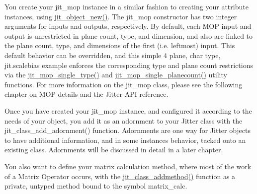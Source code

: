 You create your jit\_\-mop instance in a similar fashion to creating your attribute instances, using \hyperlink{group__objectmod_gabde2eb49750992ec4125af862b402342}{jit\_\-object\_\-new()}. The jit\_\-mop constructor has two integer arguments for inputs and outputs, respectively. By default, each MOP input and output is unrestricted in plane count, type, and dimension, and also are linked to the plane count, type, and dimensions of the first (i.e. leftmost) input. This default behavior can be overridden, and this simple 4 plane, char type, jit.scalebias example enforces the corresponding type and plane count restrictions via the \hyperlink{group__mopmod_ga8923e590eaf3cdb7d92c7f982ddc169f}{jit\_\-mop\_\-single\_\-type()} and \hyperlink{group__mopmod_gada02eaa2a5dc001cdb120a83cb093e25}{jit\_\-mop\_\-single\_\-planecount()} utility functions. For more information on the jit\_\-mop class, please see the following chapter on MOP details and the Jitter API reference.

Once you have created your jit\_\-mop instance, and configured it according to the needs of your object, you add it as an adornment to your Jitter class with the jit\_\-class\_\-add\_\-adornment() function. Adornments are one way for Jitter objects to have additional information, and in some instances behavior, tacked onto an existing class. Adornments will be discussed in detail in a later chapter.

You also want to define your matrix calculation method, where most of the work of a Matrix Operator occurs, with the \hyperlink{group__classmod_gab3b84bc08f9f3ee0b29010f653c5ea77}{jit\_\-class\_\-addmethod()} function as a private, untyped method bound to the symbol matrix\_\-calc.


